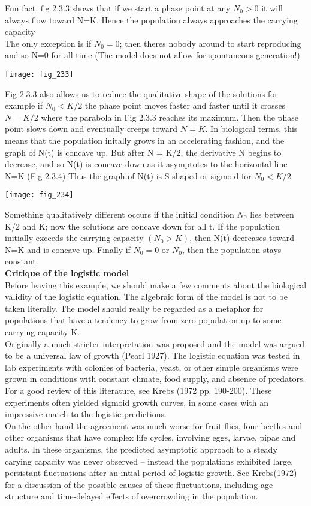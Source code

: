\documentclass{article}
\begin{document}
Fun fact, fig 2.3.3 shows that if we start a phase point at any $N_{0}>0$ it will always flow toward N=K. Hence the population always approaches the carrying capacity \\

The only exception is if $N_{0}=0$; then theres nobody around to start reproducing and so N=0 for all time (The model does not allow for spontaneous generation!)

\texttt{[image: fig\_233]}

Fig 2.3.3 also allows us to reduce the qualitative shape of the solutions for example if $N_{0} < K/2$ the phase point moves faster and faster until it crosses $N=K/2$ where the parabola in Fig 2.3.3 reaches its maximum. Then the phase point slows down and eventually creeps toward $N=K$. In biological terms, this means that the population initally grows in an accelerating fashion, and the graph of N(t) is concave up. But after N = K/2, the derivative N begins to decrease, and so N(t) is concave down as it asymptotes to the horizontal line N=K (Fig 2.3.4) Thus the graph of N(t) is S-shaped or sigmoid for $N_{0}<K/2$

\texttt{[image: fig\_234]}

Something qualitatively different occurs if the initial condition $N_{0}$ lies between K/2 and K; now the solutions are concave down for all t. If the population initially exceeds the carrying capacity $(N_{0} > K)$, then N(t) decreases toward N=K and is concave up. Finally if $N_{0}=0$ or $N_{0}$, then the population stays constant. \\

\textbf {Critique of the logistic model} \\ Before leaving this example, we should make a few comments about the biological validity of the logistic equation. The algebraic form of the model is not to be taken literally. The model should really be regarded as a metaphor for populations that have a tendency to grow from zero population up to some carrying capacity K. \\

Originally a much stricter interpretation was proposed and the model was argued to be a universal law of growth (Pearl 1927). The logistic equation was tested in lab experiments with colonies of bacteria, yeast, or other simple organisms were grown in conditions with constant climate, food supply, and absence of predators. For a good review of this literature, see Krebs (1972 pp. 190-200). These experiments often yielded sigmoid growth curves, in some cases with an impressive match to the logistic predictions. \\
On the other hand the agreement was much worse for fruit flies, four beetles and other organisms that have complex life cycles, involving eggs, larvae, pipae and adults. In these organisms, the predicted asymptotic approach to a steady carying capacity was never observed -- instead the populations exhibited large, persistant fluctuations after an intial period of logistic growth. See Krebs(1972) for a discussion of the possible causes of these fluctuations, including age structure and time-delayed effects of overcrowding in the population.
\end{document}
